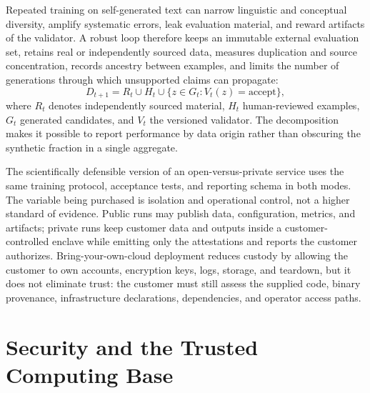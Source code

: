 Repeated training on self-generated text can narrow linguistic and conceptual diversity, amplify systematic errors, leak evaluation material, and reward artifacts of the validator. A robust loop therefore keeps an immutable external evaluation set, retains real or independently sourced data, measures duplication and source concentration, records ancestry between examples, and limits the number of generations through which unsupported claims can propagate:
\[
D_{t+1} = R_t \cup H_t \cup \{ z \in G_t : V_t(z) = \mathrm{accept} \},
\]
where $R_t$ denotes independently sourced material, $H_t$ human-reviewed examples, $G_t$ generated candidates, and $V_t$ the versioned validator. The decomposition makes it possible to report performance by data origin rather than obscuring the synthetic fraction in a single aggregate.

The scientifically defensible version of an open-versus-private service uses the same training protocol, acceptance tests, and reporting schema in both modes. The variable being purchased is isolation and operational control, not a higher standard of evidence. Public runs may publish data, configuration, metrics, and artifacts; private runs keep customer data and outputs inside a customer-controlled enclave while emitting only the attestations and reports the customer authorizes. Bring-your-own-cloud deployment reduces custody by allowing the customer to own accounts, encryption keys, logs, storage, and teardown, but it does not eliminate trust: the customer must still assess the supplied code, binary provenance, infrastructure declarations, dependencies, and operator access paths.

\section{Security and the Trusted Computing Base}

